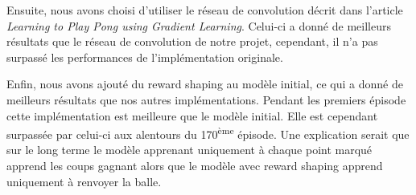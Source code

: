 \par Ensuite, nous avons choisi d'utiliser le réseau de convolution 
décrit dans l'article \emph{Learning to Play Pong using Gradient Learning}\cite{PongPolicyGradient}.
Celui-ci a donné de meilleurs résultats que le réseau de convolution de notre projet, cependant, il n'a pas surpassé 
les performances de l'implémentation originale.

\par Enfin, nous avons ajouté du reward shaping au modèle initial, ce qui a donné de meilleurs résultats que nos autres 
implémentations. Pendant les premiers épisode cette implémentation est meilleure que le modèle initial.
Elle est cependant surpassée par celui-ci aux alentours du 170\textsuperscript{ème} épisode.
Une explication serait que sur le long terme le modèle apprenant uniquement à chaque point marqué
apprend les coups gagnant alors que le modèle avec reward shaping apprend uniquement à renvoyer la balle.
